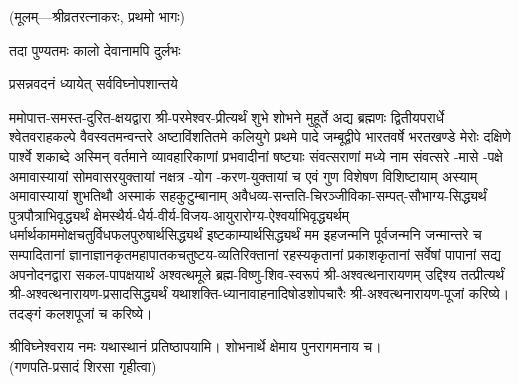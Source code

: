 
\centerline{\small{(मूलम्—श्रीव्रतरत्नाकरः, प्रथमो भागः)}}

{तदा पुण्यतमः कालो देवानामपि दुर्लभः}




{प्रसन्नवदनं ध्यायेत् सर्वविघ्नोपशान्तये}


ममोपात्त-समस्त-दुरित-क्षयद्वारा श्री-परमेश्वर-प्रीत्यर्थं शुभे शोभने मुहूर्ते अद्य ब्रह्मणः
द्वितीयपरार्धे श्वेतवराहकल्पे वैवस्वतमन्वन्तरे अष्टाविंशतितमे कलियुगे प्रथमे पादे
जम्बूद्वीपे भारतवर्षे भरतखण्डे मेरोः दक्षिणे पार्श्वे शकाब्दे अस्मिन् वर्तमाने व्यावहारिकाणां
प्रभवादीनां षष्ट्याः संवत्सराणां मध्ये \blank{} नाम संवत्सरे
\blank{}-मासे \blank{}-पक्षे अमावास्यायां सोमवासरयुक्तायां
\blank{} नक्षत्र \blank{}-योग \blank{}-करण-युक्तायां
च एवं गुण विशेषण विशिष्टायाम् अस्याम् अमावास्यायां शुभतिथौ
अस्माकं सहकुटुम्बानाम् अवैधव्य-सन्तति-चिरञ्जीविका-सम्पत्-सौभाग्य-सिद्ध्यर्थं
पुत्रपौत्राभि\-वृद्ध्यर्थं क्षेमस्थैर्य-धैर्य-वीर्य-विजय-आयुरारोग्य-ऐश्वर्याभिवृद्ध्यर्थम्
धर्मार्थकाममोक्ष\-चतुर्विधफलपुरुषार्थसिद्ध्यर्थं इष्टकाम्यार्थसिद्ध्यर्थं
मम इहजन्मनि पूर्वजन्मनि जन्मान्तरे च सम्पादितानां ज्ञानाज्ञानकृतमहा\-पातकचतुष्टय-व्यतिरिक्तानां
रहस्यकृतानां प्रकाशकृतानां सर्वेषां पापानां सद्य अपनोदनद्वारा सकल-पापक्षयार्थं
अश्वत्थमूले ब्रह्म-विष्णु-शिव-स्वरूपं श्री-अश्वत्थनारायणम् उद्दिश्य तत्प्रीत्यर्थं
श्री-अश्वत्थनारायण-प्रसादसिद्ध्यर्थं यथाशक्ति-ध्यानावाहनादिषोडशोपचारैः
श्री-अश्वत्थनारायण-पूजां करिष्ये। तदङ्गं कलशपूजां च करिष्ये।

श्रीविघ्नेश्वराय नमः यथास्थानं प्रतिष्ठापयामि। शोभनार्थे क्षेमाय पुनरागमनाय च।\\
(गणपति-प्रसादं शिरसा गृहीत्वा)





\begingroup
\renewcommand{\devaName}{देव}

\endgroup





